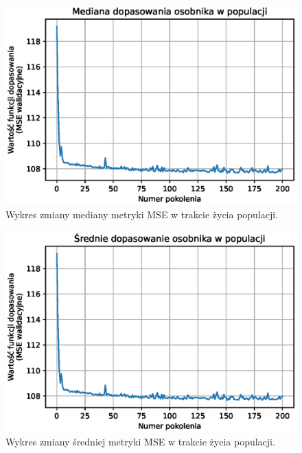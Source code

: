 \documentclass[a4paper,11pt]{article}
\begin{document}
    \bigskip

    \begin{figure}[H]
        \label{fig:g_a_mean_fitness}
        \centering
        \includegraphics[width=\textwidth]{g_a_mean_fitness}
        \caption{Wykres zmiany mediany metryki MSE w trakcie życia populacji.}
    \end{figure}

    \bigskip

    \begin{figure}[H]
        \label{fig:g_a_average_fitness}
        \centering
        \includegraphics[width=\textwidth]{g_a_average_fitness}
        \caption{Wykres zmiany średniej metryki MSE w trakcie życia populacji.}
    \end{figure}

    \bigskip
\end{document}
